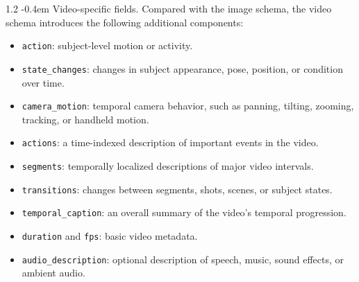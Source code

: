\documentclass{llmxive}
\makeatletter
\providecommand{\paragraph}{  \@startsection{paragraph}{4}{\z@}    {1\baselineskip \@plus .2\baselineskip}    {-0.4em}    {\normalfont\normalsize\bfseries}}
\makeatother
\begin{document}
\paragraph{Video-specific fields.}
Compared with the image schema, the video schema introduces the following additional components:
\begin{itemize}
    \item \texttt{action}: subject-level motion or activity.
    \item \texttt{state\_changes}: changes in subject appearance, pose, position, or condition over time.
    \item \texttt{camera\_motion}: temporal camera behavior, such as panning, tilting, zooming, tracking, or handheld motion.
    \item \texttt{actions}: a time-indexed description of important events in the video.
    \item \texttt{segments}: temporally localized descriptions of major video intervals.
    \item \texttt{transitions}: changes between segments, shots, scenes, or subject states.
    \item \texttt{temporal\_caption}: an overall summary of the video’s temporal progression.
    \item \texttt{duration} and \texttt{fps}: basic video metadata.
    \item \texttt{audio\_description}: optional description of speech, music, sound effects, or ambient audio.
\end{itemize}
\end{document}
